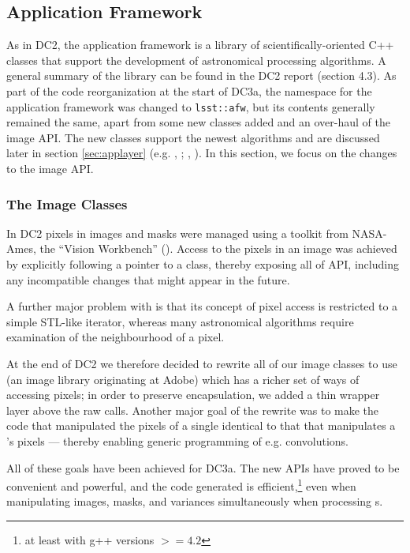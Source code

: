 \subsection{Application Framework}

As in DC2, the application framework is a library of
scientifically-oriented C++ classes that support the development of
astronomical processing algorithms.  A general summary of the library
can be found in the DC2 report (section 4.3).  As part of the code
reorganization at the start of DC3a, the namespace for the application
framework was changed to {\tt lsst::afw}, but its contents generally
remained the same, apart from some new classes added and an over-haul
of the image API.  The new classes support the newest algorithms and
are discussed later in section \ref{sec:applayer}
(e.g. , ; ,
).  In this section, we focus on the changes to the image
API.  

\subsubsection{The Image Classes}
\label{secImageClasses}

In DC2 pixels in images and masks were managed using a toolkit from NASA-Ames, the ``Vision Workbench'' ().
Access to the pixels in an image was achieved by explicitly following a pointer to a  class,
thereby exposing all of  API, including any incompatible changes that might appear in
the future.

A further major problem with  is that its concept of pixel access is restricted to a simple
STL-like iterator, whereas many astronomical algorithms require examination of the neighbourhood of
a pixel.

At the end of DC2 we therefore decided to rewrite all of our image classes to use 
(an image library originating at Adobe) which has a richer set of ways of accessing pixels;  in
order to preserve encapsulation, we added a thin wrapper layer above the raw  calls.
Another major goal of the rewrite was to make the code that manipulated the pixels of a single
 identical to that that manipulates a 's pixels --- thereby enabling
generic programming of e.g. convolutions.

All of these goals have been achieved for DC3a.  The new APIs have proved to be convenient and
powerful, and the code generated is efficient,\footnote{at least with g++ versions $>= 4.2$} even when
manipulating images, masks, and variances simultaneously when processing s.

